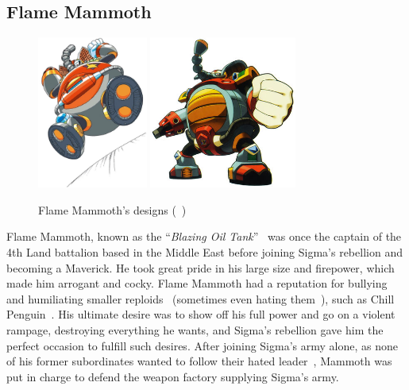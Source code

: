 \subsection{Flame Mammoth}\label{boss:Flame_mammoth}
\begin{figure}[htp]
	\centering
	\includegraphics[height=5cm]{figures/X1/Flame_mammoth/Flame_mammoth.jpg}
	\includegraphics[height=5cm]{figures/X1/Flame_mammoth/MHXFlameMammoth.jpg}
	\caption{Flame Mammoth's designs (~\cite{book:MMX_Complete_art})}
\end{figure}

Flame Mammoth, known as the ``\textit{Blazing Oil Tank}''~\cite{book:MMX_Complete_art} was once the captain of the 4th Land battalion based in the Middle East before joining Sigma's rebellion and becoming a Maverick. He took great pride in his large size and firepower, which made him arrogant and cocky. Flame Mammoth had a reputation for bullying and humiliating smaller reploids~\cite{wayback:X_resources} (sometimes even hating them~\cite{wayback:X_resources}), such as Chill Penguin~\cite{wiki:Flame_mammoth}. His ultimate desire was to show off his full power and go on a violent rampage, destroying everything he wants, and Sigma's rebellion gave him the perfect occasion to fulfill such desires. After joining Sigma's army alone, as none of his former subordinates wanted to follow their hated leader~\cite{MHX:manual}, Mammoth was put in charge to defend the weapon factory supplying Sigma's army.

